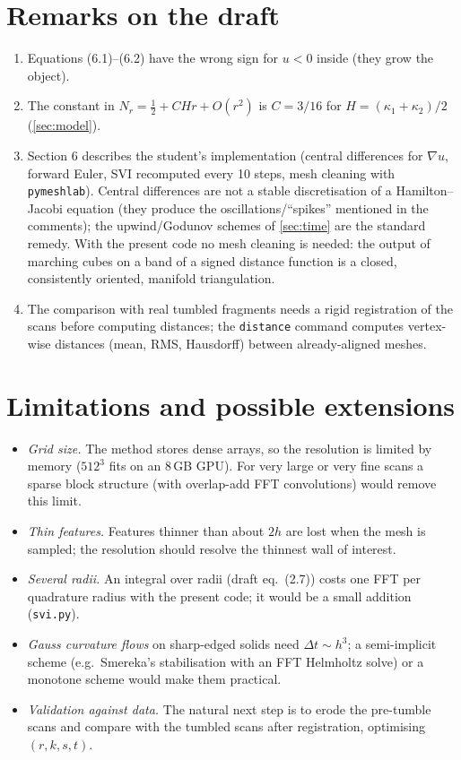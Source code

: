 \documentclass[11pt]{article}
\newcommand{\N}{N_r}
\newcommand{\code}[1]{\texttt{#1}}
\begin{document}
\section{Remarks on the draft}
\begin{enumerate}
\item Equations (6.1)--(6.2) have the wrong sign for $u<0$ inside (they grow the object).
\item The constant in $\N=\frac12+CHr+O(r^2)$ is $C=3/16$ for $H=(\kappa_1+\kappa_2)/2$
(\cref{sec:model}).
\item Section 6 describes the student's implementation (central differences for $\nabla u$, forward Euler,
SVI recomputed every 10 steps, mesh cleaning with \code{pymeshlab}). Central differences are not a stable
discretisation of a Hamilton--Jacobi equation (they produce the oscillations/``spikes'' mentioned in the
comments); the upwind/Godunov schemes of \cref{sec:time} are the standard remedy. With the present code no
mesh cleaning is needed: the output of marching cubes on a band of a signed distance function is a closed,
consistently oriented, manifold triangulation.
\item The comparison with real tumbled fragments needs a rigid registration of the scans before computing
distances; the \code{distance} command computes vertex-wise distances (mean, RMS, Hausdorff) between
already-aligned meshes.
\end{enumerate}

\section{Limitations and possible extensions}\label{sec:future}
\begin{itemize}
\item \emph{Grid size.} The method stores dense arrays, so the resolution is limited by memory ($512^3$ fits
on an 8\,GB GPU). For very large or very fine scans a sparse block structure (with overlap-add FFT
convolutions) would remove this limit.
\item \emph{Thin features.} Features thinner than about $2h$ are lost when the mesh is sampled; the
resolution should resolve the thinnest wall of interest.
\item \emph{Several radii.} An integral over radii (draft eq.\ (2.7)) costs one FFT per quadrature radius
with the present code; it would be a small addition (\code{svi.py}).
\item \emph{Gauss curvature flows} on sharp-edged solids need $\Delta t\sim h^3$; a semi-implicit scheme
(e.g.\ Smereka's stabilisation with an FFT Helmholtz solve) or a monotone scheme would make them practical.
\item \emph{Validation against data.} The natural next step is to erode the pre-tumble scans and compare with
the tumbled scans after registration, optimising $(r,k,s,t)$.
\end{itemize}
\end{document}
